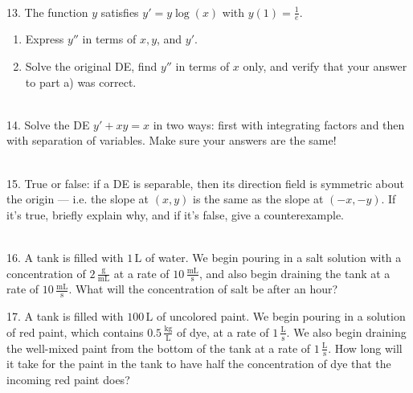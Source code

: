 \documentclass{article}
\begin{document}
~\\

13. The function $y$ satisfies $y' = y\log(x)$ with $\displaystyle y(1) = \frac{1}{e}.$

\begin{enumerate}

	\item Express $y''$ in terms of $x, y$, and $y'$.

	\item Solve the original DE, find $y''$ in terms of $x$ only, and verify that your answer to part a) was correct.

\end{enumerate}

~\\

14. Solve the DE $\displaystyle y' + xy = x$ in two ways: first with integrating factors and then with separation of variables. Make sure your answers are the same!

~\\

15. True or false: if a DE is separable, then its direction field is symmetric about the origin --- i.e. the slope at $(x, y)$ is the same as the slope at $(-x, -y)$. If it's true, briefly explain why, and if it's false, give a counterexample.

~\\

16. A tank is filled with $1\,\text{L}$ of water. We begin pouring in a salt solution with a concentration of $2\,\frac{\text{g}}{\text{mL}}$ at a rate of $10\,\frac{\text{mL}}{\text{s}}$, and also begin draining the tank at a rate of $10\,\frac{\text{mL}}{\text{s}}$. What will the concentration of salt be after an hour?

17. A tank is filled with $100\,\text{L}$ of uncolored paint. We begin pouring in a solution of red paint, which contains $0.5\,\frac{\text{kg}}{\text{L}}$ of dye, at a rate of $1\,\frac{\text{L}}{\text{s}}$. We also begin draining the well-mixed paint from the bottom of the tank at a rate of $1\,\frac{\text{L}}{\text{s}}$. How long will it take for the paint in the tank to have half the concentration of dye that the incoming red paint does?
\end{document}
